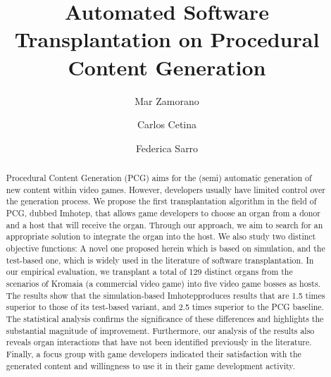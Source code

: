 \documentclass[sigconf,screen,review]{acmart}
\newcommand{\ApproachName}{{\sc Imhotep}}
\newcommand{\CaseStudy}{Kromaia}
\begin{document}
\title{Automated Software Transplantation on Procedural Content Generation}

\author{Mar Zamorano}

\author{Carlos Cetina}

\author{Federica Sarro}

\renewcommand{\shortauthors}{Zamorano et al.}

\begin{abstract}
Procedural Content Generation (PCG) aims for the (semi) automatic generation of new content within video games. However, developers usually have limited control over the generation process.
We propose the first transplantation algorithm in the field of PCG, dubbed \ApproachName, that allows game developers to choose an organ from a donor and a host that will receive the organ. 
Through our approach, we aim to search for an appropriate solution to integrate the organ into the host. 
We also study two distinct objective functions: A novel one proposed herein which is based on simulation, and the test-based one, which is widely used in the literature of software transplantation.
In our empirical evaluation, we transplant a total of 129 distinct organs from the scenarios of \CaseStudy{} (a commercial video game) into five video game bosses as hosts.
The results show that the simulation-based \ApproachName produces results that are 1.5 times superior to those of its test-based variant, and 2.5 times superior to the PCG baseline. 
The statistical analysis confirms the significance of these differences and highlights the substantial magnitude of improvement. 
Furthermore, our analysis of the results also reveals organ interactions that have not been  identified previously in the literature.
Finally, a focus group with game developers indicated their satisfaction with the generated content and willingness to use it in their game development activity.
\end{abstract}
\end{document}
